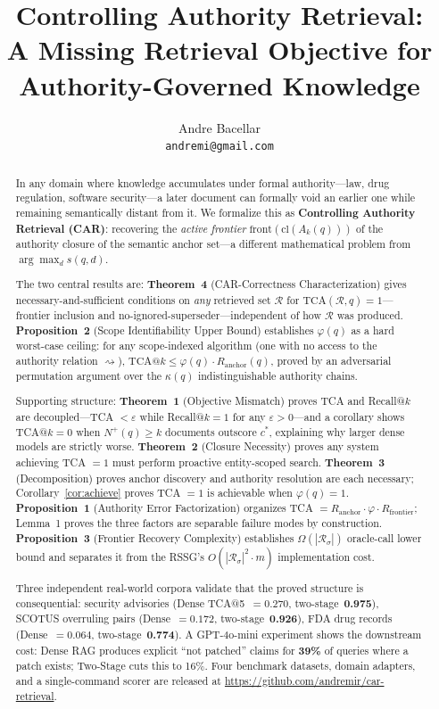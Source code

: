 \documentclass[11pt]{article}
\title{Controlling Authority Retrieval:\\
A Missing Retrieval Objective for Authority-Governed Knowledge}
\author{
  Andre Bacellar \\
  \texttt{andremi@gmail.com}
}
\begin{document}
\maketitle

\begin{abstract}
In any domain where knowledge accumulates under formal authority---law, drug regulation, software security---a later document can formally void an earlier one while remaining semantically distant from it. We formalize this as \textbf{Controlling Authority Retrieval (CAR)}: recovering the \emph{active frontier} $\mathrm{front}(\mathrm{cl}(A_k(q)))$ of the authority closure of the semantic anchor set---a different mathematical problem from $\arg\max_d s(q,d)$.

The two central results are: \textbf{Theorem~4} (CAR-Correctness Characterization) gives necessary-and-sufficient conditions on \emph{any} retrieved set $\mathcal{R}$ for $\mathrm{TCA}(\mathcal{R},q) = 1$---frontier inclusion and no-ignored-superseder---independent of how $\mathcal{R}$ was produced. \textbf{Proposition~2} (Scope Identifiability Upper Bound) establishes $\varphi(q)$ as a hard worst-case ceiling: for any scope-indexed algorithm (one with no access to the authority relation $\rightsquigarrow$), $\mathrm{TCA}@k \leq \varphi(q) \cdot R_{\mathrm{anchor}}(q)$, proved by an adversarial permutation argument over the $\kappa(q)$ indistinguishable authority chains.

Supporting structure: \textbf{Theorem~1} (Objective Mismatch) proves TCA and Recall@$k$ are decoupled---TCA $< \varepsilon$ while Recall@$k = 1$ for any $\varepsilon > 0$---and a corollary shows TCA@$k = 0$ when $N^+(q) \geq k$ documents outscore $c^*$, explaining why larger dense models are strictly worse. \textbf{Theorem~2} (Closure Necessity) proves any system achieving TCA $= 1$ must perform proactive entity-scoped search. \textbf{Theorem~3} (Decomposition) proves anchor discovery and authority resolution are each necessary; Corollary~\ref{cor:achieve} proves TCA $= 1$ is achievable when $\varphi(q) = 1$. \textbf{Proposition~1} (Authority Error Factorization) organizes TCA $= R_{\mathrm{anchor}} \cdot \varphi \cdot R_{\mathrm{frontier}}$; Lemma~1 proves the three factors are separable failure modes by construction. \textbf{Proposition~3} (Frontier Recovery Complexity) establishes $\Omega(|\mathcal{R}_\sigma|)$ oracle-call lower bound and separates it from the RSSG's $O(|\mathcal{R}_\sigma|^2 \cdot m)$ implementation cost.

Three independent real-world corpora validate that the proved structure is consequential: security advisories (Dense TCA@5~$= 0.270$, two-stage~\textbf{0.975}), SCOTUS overruling pairs (Dense~$= 0.172$, two-stage~\textbf{0.926}), FDA drug records (Dense~$= 0.064$, two-stage~\textbf{0.774}). A GPT-4o-mini experiment shows the downstream cost: Dense RAG produces explicit ``not patched'' claims for \textbf{39\%} of queries where a patch exists; Two-Stage cuts this to 16\%. Four benchmark datasets, domain adapters, and a single-command scorer are released at \url{https://github.com/andremir/car-retrieval}.
\end{abstract}
\end{document}
